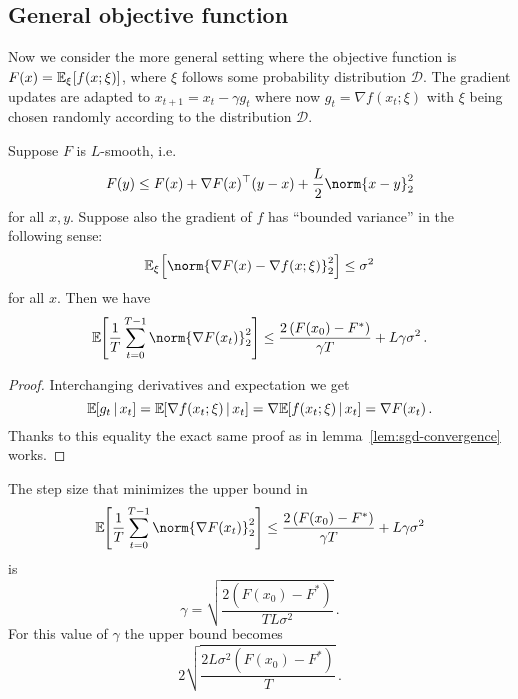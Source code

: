 \documentclass{article}
\begin{document}
\subsection{General objective function}



Now we consider the more general setting where the objective function is $F(x) = \expec[\xi]{f(x;\xi)}$, where $\xi$ follows some probability distribution $\mathcal D$. The gradient updates are adapted to $x_{t+1} = x_t - \gamma g_t$ where now $g_t = \nabla f(x_t; \xi)$ with $\xi$ being chosen randomly according to the distribution $\mathcal D$.




\begin{lemma}\label{lem:sgd-convergence-general}
  Suppose $F$ is $L$-smooth, i.e.
  \[
    F(y) \leq F(x) + \nabla F(x)^\top (y - x) + \frac{L}{2} \norm{x - y}_2^2
  \]
  for all $x, y$. Suppose also the gradient of $f$ has ``bounded variance'' in the following sense:
  \[
    \expec[\xi]{\norm{\nabla F(x) - \nabla f(x; \xi)}_2^2} \leq \sigma^2
  \]
  for all $x$.
  Then we have
  \[
    \expec{ \frac{1}{T} \sum_{t=0}^{T-1} \norm{\nabla F(x_t)}_2^2 }
    \leq
    \frac{2\left(F(x_0) - F^\ast\right)}{\gamma T} + L \gamma \sigma^2
    \, .
  \]
\end{lemma}


\begin{proof}
  Interchanging derivatives and expectation we get
  \[
    \expec{g_t \,|\, x_t} = \expec{\nabla f(x_t; \xi) \,|\, x_t} = \nabla \expec{f(x_t; \xi) \,|\, x_t} = \nabla F(x_t)
    \, .
  \]
  Thanks to this equality the exact same proof as in lemma~\ref{lem:sgd-convergence} works.
\end{proof}



\begin{lemma}\label{lem:sgd-stepsize}
  The step size that minimizes the upper bound in
  \[
    \expec{ \frac{1}{T} \sum_{t=0}^{T-1} \norm{\nabla F(x_t)}_2^2 }
    \leq
    \frac{2\left(F(x_0) - F^\ast\right)}{\gamma T} + L \gamma \sigma^2
  \]
  is
  \[
    \gamma = \sqrt{\frac{2(F(x_0) - F^\ast)}{T L \sigma^2}}
    \, .
  \]
  For this value of $\gamma$ the upper bound becomes
  \[
    2 \sqrt{\frac{2L \sigma^2 (F(x_0) - F^\ast)}{T}}
    \, .
  \]
\end{lemma}
\end{document}
